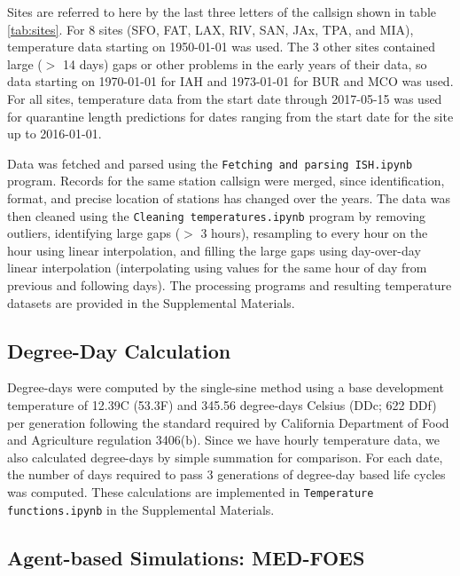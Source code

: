 \documentclass[10pt,a4paper,twocolumn]{article}
\begin{document}
Sites are referred to here by the last three letters of the callsign shown in table \ref{tab:sites}.
For 8 sites (SFO, FAT, LAX, RIV, SAN, JAx, TPA, and MIA), temperature data starting on 1950-01-01 was used.
The 3 other sites contained large ($>$ 14 days) gaps or other problems in the early years of their data,
so data starting on 1970-01-01 for IAH and 1973-01-01 for BUR and MCO was used.
For all sites, temperature data from the start date through 2017-05-15 was used
for quarantine length predictions for dates ranging from the start date for the site up to 2016-01-01.

Data was fetched and parsed using the \texttt{Fetching and parsing ISH.ipynb} program.
Records for the same station callsign were merged, since identification, format, 
and precise location of stations has changed over the years.
The data was then cleaned using the 
\texttt{Cleaning temperatures.ipynb} program by 
removing outliers, 
identifying large gaps ($>$ 3 hours), 
resampling to every hour on the hour using linear interpolation,
and filling the large gaps using day-over-day linear interpolation
(interpolating using values for the same hour of day from previous and following days).
The processing programs and resulting temperature datasets are 
provided in the Supplemental Materials.


\subsection*{Degree-Day Calculation}
Degree-days were computed by the single-sine method\cite{ECY:ECY1969503514}
using a base development temperature of 12.39\degree C (53.3\degree F) 
and 345.56 degree-days Celsius (DDc; 622 DDf) per generation 
following the standard required by California Department of Food and Agriculture
regulation 3406(b)\cite{CDFA_Medfly,3-CA-ADC-3406}.
Since we have hourly temperature data, we also calculated degree-days by simple summation
for comparison\cite{Roltsch1999}.
For each date, the number of days required to pass 3 generations of degree-day 
based life cycles was computed.
These calculations are implemented in \texttt{Temperature functions.ipynb} in the Supplemental Materials.


\subsection*{Agent-based Simulations: MED-FOES}
\end{document}
